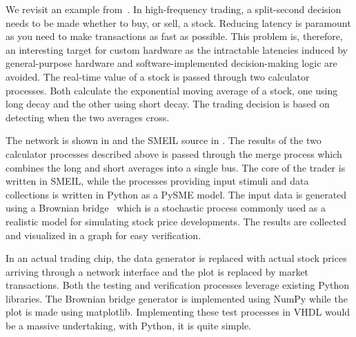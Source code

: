 We revisit an example from~\cite{asheim2016vhdl}. In high-frequency trading, a
split-second decision needs to be made whether to buy, or sell, a
stock. Reducing latency is paramount as you need to make transactions as fast as
possible. This problem is, therefore, an interesting target for custom hardware
as the intractable latencies induced by general-purpose hardware and
software-implemented decision-making logic are avoided. The real-time value of a
stock is passed through two calculator processes. Both calculate the exponential
moving average of a stock, one using long decay and the other using short
decay. The trading decision is based on detecting when the two averages
cross.~\cite{kablan2012use}

The network is shown in  and the SMEIL source in
. The results of the two calculator processes described above
is passed through the merge process which combines the long and short averages
into a single bus. The core of the trader is written in SMEIL, while the
processes providing input stimuli and data collections is written in Python as a
PySME model. The input data is generated using a Brownian
bridge~\cite{glasserman2003monte} which is a stochastic process commonly used as
a realistic model for simulating stock price developments. The results are
collected and visualized in a graph for easy verification.

In an actual trading chip, the data generator is replaced with actual stock
prices arriving through a network interface and the plot is replaced by market
transactions. Both the testing and verification processes leverage existing
Python libraries. The Brownian bridge generator is implemented using NumPy while
the plot is made using matplotlib. Implementing these test processes in VHDL
would be a massive undertaking, with Python, it is quite simple.

